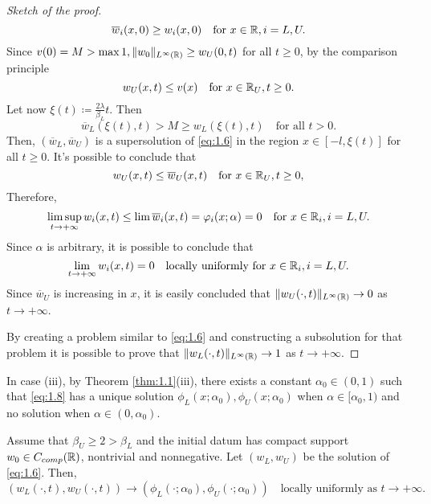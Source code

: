\begin{proof}[Sketch of the proof]
    \[
        \overline{w}_i(x, 0) \geq w_i(x, 0) \quad \text{for } x \in \mathbb{R}, i = L, U.
    \] 
    Since \(v(0) = M > \max{1, \lVert w_0\rVert_{L^{\infty}(\mathbb{R})}} \geq w_U(0, t)\) for all \(t \geq 0\), by the comparison principle
    \[
        w_U(x, t) \leq v(x) \quad \text{for } x \in \mathbb{R}_U, t \geq 0.
    \]
    Let now \(\xi(t) \coloneqq \frac{2\lambda}{\beta_L} t\). Then 
    \[
        \overline{w}_L(\xi(t), t) > M \geq w_L(\xi(t), t) \quad \text{for all } t > 0.
    \]
    Then, \((\overline{w}_L, \overline{w}_U)\) is a supersolution of \eqref{eq:1.6} in the region \(x \in [-l, \xi(t)]\) for all \(t \geq 0\). It's possible to conclude that
    \[
        w_U(x, t) \leq \overline{w}_U(x, t) \quad \text{for } x \in \mathbb{R}_U, t \geq 0,
    \]
    Therefore,
    \[
        \limsup_{t \to +\infty} w_i(x, t) \leq \lim \overline{w}_i(x, t) = \varphi_i(x; \alpha) = 0 \quad \text{for } x \in \mathbb{R}_i, i = L, U.
    \]
    Since \(\alpha\) is arbitrary, it is possible to conclude that
    \[
        \lim_{t \to +\infty} w_i(x, t) = 0 \quad \text{locally uniformly for } x \in \mathbb{R}_i, i = L, U.
    \]
    Since \(\overline{w}_U\) is increasing in \(x\), it is easily concluded that \(\lVert w_U(\cdot, t)\rVert_{L^{\infty}(\mathbb{R})} \to 0\) as \(t \to +\infty\).

    By creating a problem similar to \eqref{eq:1.6} and constructing a subsolution for that problem it is possible to prove that \(\lVert w_L(\cdot, t)\rVert_{L^{\infty}(\mathbb{R})} \to 1\) as \(t \to +\infty\).
\end{proof}

In case (iii), by Theorem \ref{thm:1.1}(iii), there exists a constant \(\alpha_0 \in (0, 1)\) such that \eqref{eq:1.8} has a unique solution \(\phi_L(x; \alpha_0), \phi_U(x; \alpha_0)\) when \(\alpha \in [\alpha_0, 1)\) and no solution when \(\alpha \in (0, \alpha_0)\). 
\begin{theorem}
    Assume that \(\beta_U \geq 2 > \beta_L\) and the initial datum has compact support \(w_{0} \in C_{comp}(\mathbb{R})\), nontrivial and nonnegative. Let \((w_L, w_{U})\) be the solution of \eqref{eq:1.6}. Then,
    \[
        (w_L(\cdot, t), w_{U}(\cdot, t)) \to (\phi_L(\cdot; \alpha_0), \phi_U(\cdot; \alpha_0)) \quad \text{locally uniformly as } t \to +\infty.
    \]
    \label{thm:3.3}
\end{theorem}

